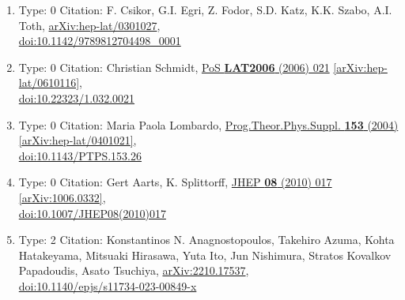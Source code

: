 \documentclass[a4paper,10pt]{article}
\begin{document}
\begin{enumerate}
\begin{enumerate}
  \item Type: 0 Citation: F. Csikor, G.I. Egri, Z. Fodor, S.D. Katz, K.K. Szabo, A.I. Toth, \href{https://arxiv.org/abs/hep-lat/0301027}{arXiv:hep-lat/0301027},\\\href{https://www.doi.org/10.1142/9789812704498_0001}{doi:10.1142/9789812704498\_0001}
  \item Type: 0 Citation: Christian Schmidt, \href{https://www.doi.org/10.22323/1.032.0021}{PoS {\bf LAT2006} (2006) 021}  \href{https://arxiv.org/abs/hep-lat/0610116}{[arXiv:hep-lat/0610116]},\\\href{https://www.doi.org/10.22323/1.032.0021}{doi:10.22323/1.032.0021}
  \item Type: 0 Citation: Maria Paola Lombardo, \href{https://www.doi.org/10.1143/PTPS.153.26}{Prog.Theor.Phys.Suppl. {\bf 153} (2004) }  \href{https://arxiv.org/abs/hep-lat/0401021}{[arXiv:hep-lat/0401021]},\\\href{https://www.doi.org/10.1143/PTPS.153.26}{doi:10.1143/PTPS.153.26}
  \item Type: 0 Citation: Gert Aarts, K. Splittorff, \href{https://www.doi.org/10.1007/JHEP08(2010)017}{JHEP {\bf 08} (2010) 017}  \href{https://arxiv.org/abs/1006.0332}{[arXiv:1006.0332]},\\\href{https://www.doi.org/10.1007/JHEP08(2010)017}{doi:10.1007/JHEP08(2010)017}
  \item Type: 2 Citation: Konstantinos N. Anagnostopoulos, Takehiro Azuma, Kohta Hatakeyama, Mitsuaki Hirasawa, Yuta Ito, Jun Nishimura, Stratos Kovalkov Papadoudis, Asato Tsuchiya, \href{https://arxiv.org/abs/2210.17537}{arXiv:2210.17537},\\\href{https://www.doi.org/10.1140/epjs/s11734-023-00849-x}{doi:10.1140/epjs/s11734-023-00849-x}

\end{enumerate}
\end{enumerate}
\end{document}
